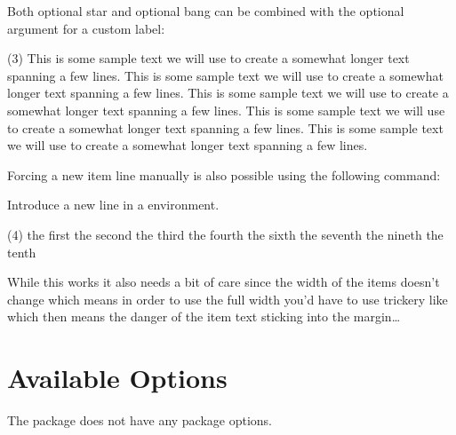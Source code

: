 \documentclass[load-preamble+]{cnltx-doc}
\newcommand*\sample{This is some sample text we will use to create a somewhat
  longer text spanning a few lines.}
\begin{document}
Both optional star and optional bang can be combined with the optional
argument for a custom label:
\begin{example}
  \begin{tasks}(3)
    \task \sample
    \task* \sample
    \task*[(x)] \sample
    \task \sample
    \task \sample
  \end{tasks}
\end{example}

Forcing a new item line manually is also possible using the
following command:
\begin{commands}
    Introduce a new line in a  environment.
\end{commands}
\begin{example}
  \begin{tasks}(4)
    \task the first
    \task the second
    \task the third
    \task the fourth
    \task {}
      \startnewitemline 
    \task the sixth
    \task the seventh
    \task {} \startnewitemline
    \task the nineth
    \task the tenth
  \end{tasks}
\end{example}

While this works it also needs a bit of care since the width of the items
doesn't change which means in order to use the full width you'd have to use
trickery like  which then means the danger of the item text sticking
into the margin\ldots

\section{Available Options}\label{sec:tasks:options}

The \Tasks{} package does not have any package options.
\end{document}
